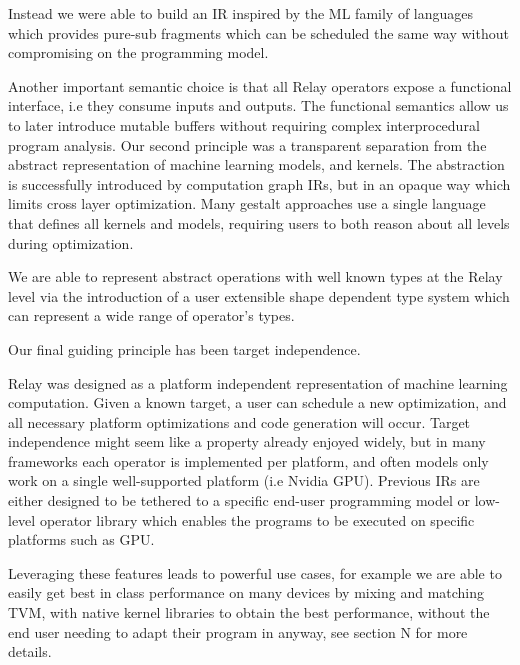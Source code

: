 
Instead we were able to build an IR inspired by the ML family of languages which provides pure-sub fragments which can be scheduled
  the same way without compromising on the programming model.

Another important semantic choice is that all Relay operators expose a functional interface, i.e they consume inputs and outputs.
The functional semantics allow us to later introduce mutable buffers without requiring complex interprocedural program analysis.
Our second principle was a transparent separation from the abstract representation of machine learning models, and kernels.
The abstraction is successfully introduced by computation graph IRs, but in an opaque way which limits cross layer optimization.
Many gestalt approaches use a single language that defines all kernels and models, requiring users to both reason about all levels during optimization.

We are able to represent abstract operations with well known types at the Relay level via the introduction of a user extensible shape dependent
  type system which can represent a wide range of operator’s types.

Our final guiding principle has been target independence.

Relay was designed as a platform independent representation of machine learning computation.
Given a known target, a user can schedule a new optimization,
  and all necessary platform optimizations and code generation will occur.
Target independence might seem like a property already enjoyed widely,
  but in many frameworks each operator is implemented per platform,
  and often models only work on a single well-supported platform (i.e Nvidia GPU).
Previous IRs are either designed to be tethered to a specific end-user programming model
    or low-level operator library which enables the programs to be executed on specific platforms such as GPU.

Leveraging these features leads to powerful use cases, for example we are able to easily get best in class performance on many devices
by mixing and matching TVM, with native kernel libraries to obtain the best performance, without the end user needing to adapt their program
in anyway, see section N for more details.

